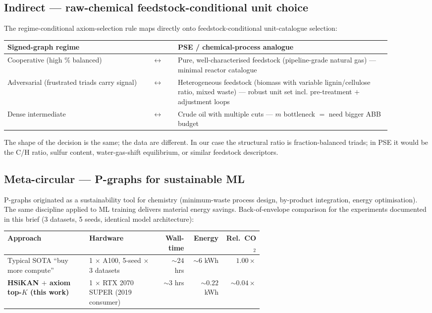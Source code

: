 \documentclass[11pt,a4paper]{article}
\begin{document}
\subsection{Indirect --- raw-chemical feedstock-conditional unit choice}

The regime-conditional axiom-selection rule maps directly onto
feedstock-conditional unit-catalogue selection:

\begin{center}\small
\begin{tabular}{p{0.34\linewidth} p{0.06\linewidth} p{0.50\linewidth}}
\toprule
Signed-graph regime              &  & PSE / chemical-process analogue \\
\midrule
Cooperative (high \% balanced)   & $\leftrightarrow$ & Pure, well-characterised feedstock (pipeline-grade natural gas) --- minimal reactor catalogue \\
Adversarial (frustrated triads carry signal) & $\leftrightarrow$ & Heterogeneous feedstock (biomass with variable lignin/cellulose ratio, mixed waste) --- robust unit set incl. pre-treatment $+$ adjustment loops \\
Dense intermediate               & $\leftrightarrow$ & Crude oil with multiple cuts --- $m$ bottleneck $=$ need bigger ABB budget \\
\bottomrule
\end{tabular}
\end{center}

The shape of the decision is the same; the data are different. In our
case the structural ratio is fraction-balanced triads; in PSE it would
be the C/H ratio, sulfur content, water-gas-shift equilibrium,
or similar feedstock descriptors.

\subsection{Meta-circular --- P-graphs for sustainable ML}

P-graphs originated as a sustainability tool for chemistry (minimum-waste
process design, by-product integration, energy optimisation). The same
discipline applied to ML training delivers material energy savings.
Back-of-envelope comparison for the experiments documented in this
brief (3 datasets, 5 seeds, identical model architecture):

\begin{center}\small
\begin{tabular}{p{0.32\linewidth} p{0.28\linewidth} rrr}
\toprule
Approach                                          & Hardware                          & Wall-time & Energy & Rel.\ CO$_2$ \\
\midrule
Typical SOTA ``buy more compute''                  & 1 $\times$ A100, 5-seed $\times$ 3 datasets & $\sim 24$ hrs & $\sim 6$ kWh   & $1.00\times$ \\
\textbf{HSiKAN $+$ axiom top-$K$ (this work)}     & 1 $\times$ RTX 2070 SUPER (2019 consumer)   & $\sim 3$ hrs  & $\sim 0.22$ kWh & $\mathbf{\sim 0.04\times}$ \\
\bottomrule
\end{tabular}
\end{center}
\end{document}
